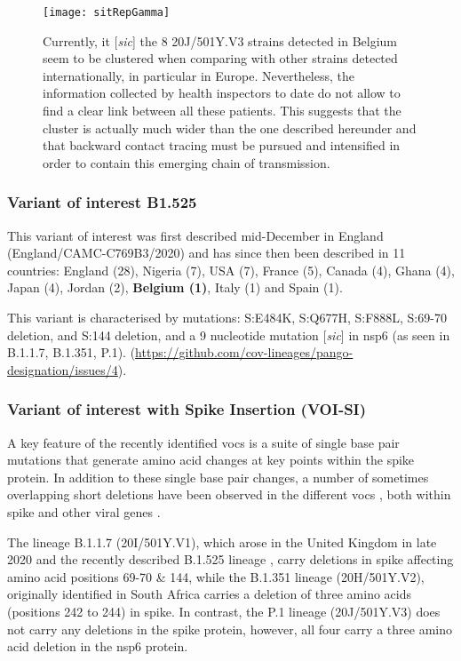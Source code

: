 \begin{figure}[ht]
  \centering
  \texttt{[image: sitRepGamma]}
  \caption[20J/501Y.V3 monitoring]{Currently, it [\textit{sic}] the 8 20J/501Y.V3 strains detected in Belgium seem to be clustered when comparing with other strains detected internationally, in particular in Europe. Nevertheless, the information collected by health inspectors to date do not allow to find a clear link between all these patients. This suggests that the cluster is actually much wider than the one described hereunder and that backward contact tracing must be pursued and intensified in order to contain this emerging chain of transmission.}
  \label{fig:sitRepGamma}
\end{figure}

\subsubsection{Variant of interest B1.525}
This variant of interest was first described mid-December in England (England/CAMC-C769B3/2020) and has since then been described in 11 countries: England (28), Nigeria (7), USA (7), France (5), Canada (4), Ghana (4), Japan (4), Jordan (2), \textbf{Belgium (1)}, Italy (1) and Spain (1).

This variant is characterised by mutations: S:E484K, S:Q677H, S:F888L, S:69-70 deletion, and S:144 deletion, and a 9 nucleotide mutation [\textit{sic}] in nsp6 (as seen in B.1.1.7, B.1.351, P.1). (\url{https://github.com/cov-lineages/pango-designation/issues/4}).

\subsubsection{Variant of interest with Spike Insertion (VOI-SI)}
A key feature of the recently identified \gls{voc}s is a suite of single base pair mutations that generate amino acid changes at key points within the spike protein.
In addition to these single base pair changes, a number of sometimes overlapping short deletions have been observed in the different \gls{voc}s \citep{garry2021spike}, both within spike and other viral genes \citep{pango4}.

The lineage B.1.1.7 (20I/501Y.V1), which arose in the United Kingdom in late 2020 \citep{rambaut2020preliminary} and the recently described B.1.525 lineage \citep{pango4}, carry deletions in spike affecting amino acid positions 69-70 \& 144, while the B.1.351 lineage (20H/501Y.V2), originally identified in South Africa \citep{Tegally2020} carries a deletion of three amino acids (positions 242 to 244) in spike.
In contrast, the P.1 lineage (20J/501Y.V3) \citep{faria2021genomic} does not carry any deletions in the spike protein, however, all four carry a three amino acid deletion in the nsp6 protein.

